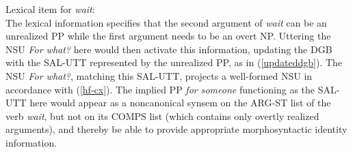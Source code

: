 {%
\ea
\label{wait}
Lexical item for \textit{wait}:\\
\z
%
The lexical information specifies that the second argument of \textit{wait} can be an unrealized PP while the first argument needs to be an overt NP. Uttering
the NSU \textit{For what?} here would then 
activate this information, updating the DGB with 
the SAL-UTT represented by the unrealized PP, as in (\ref{updateddgb}).
%
\ea
\label{updateddgb}
\z
%
The NSU \textit{For what?}, matching this SAL-UTT, projects a well-formed NSU  in accordance with (\ref{hf-cx}).  The implied PP \textit{for someone} functioning as the SAL-UTT here would appear as a noncanonical synsem on the ARG-ST list of the verb \textit{wait}, but not on its COMPS list (which contains only overtly realized arguments), and thereby be able to provide appropriate morphosyntactic identity information. 


}
